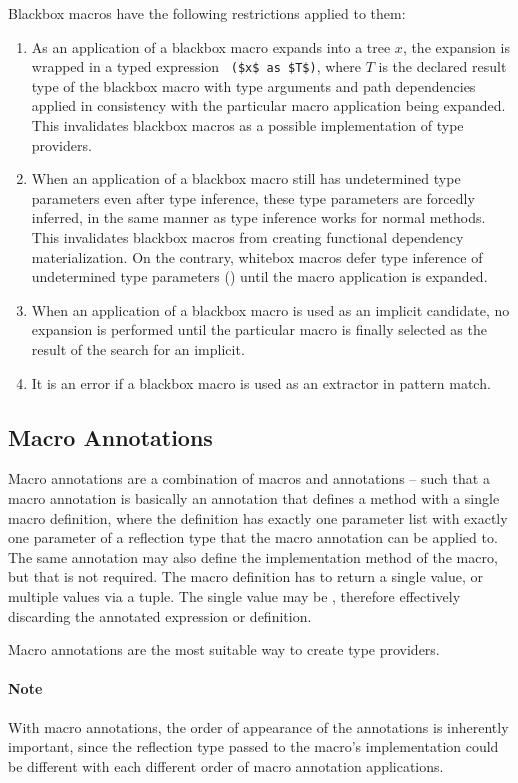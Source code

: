 Blackbox macros have the following restrictions applied to them:
\begin{enumerate}
  \item As an application of a blackbox macro expands into a tree $x$, the expansion is wrapped in a typed expression ~\lstinline!($x$ as $T$)!, where $T$ is the declared result type of the blackbox macro with type arguments and path dependencies applied in consistency with the particular macro application being expanded. This invalidates blackbox macros as a possible implementation of type providers. 
  \item When an application of a blackbox macro still has undetermined type parameters even after type inference, these type parameters are forcedly inferred, in the same manner as type inference works for normal methods. This invalidates blackbox macros from creating functional dependency materialization. On the contrary, whitebox macros defer type inference of undetermined type parameters () until the macro application is expanded. 
  \item When an application of a blackbox macro is used as an implicit candidate, no expansion is performed until the particular macro is finally selected as the result of the search for an implicit. 
  \item It is an error if a blackbox macro is used as an extractor in pattern match. 
\end{enumerate}






\subsection{Macro Annotations}
\label{sec:macro-annotations}

Macro annotations are a combination of macros and annotations -- such that a macro annotation is basically an annotation that defines a method  with a single macro definition, where the definition has exactly one parameter list with exactly one parameter of a reflection type that the macro annotation can be applied to. The same annotation may also define the implementation method of the macro, but that is not required. The macro definition has to return a single value, or multiple values via a tuple. The single value may be , therefore effectively discarding the annotated expression or definition. 

Macro annotations are the most suitable way to create type providers. 

\paragraph{Note}
With macro annotations, the order of appearance of the annotations is inherently important, since the reflection type passed to the macro's implementation could be different with each different order of macro annotation applications. 






